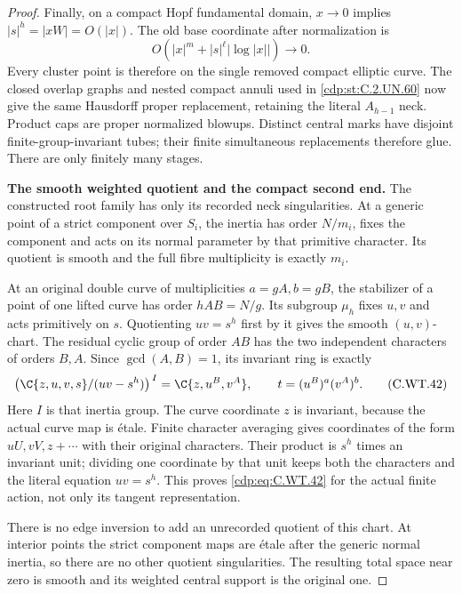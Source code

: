 \begin{proof}
Finally, on a compact Hopf
fundamental domain, \(x\to0\)
implies \(|s|^h=|xW|=O(|x|)\).
The old base coordinate after
normalization is
\[
          O(|x|^m+|s|^\ell|\log|x||)\longrightarrow0.
 \tag{C.WT.41}\label{cdp:eq:C.WT.41}
\]
Every cluster point is therefore
on the single removed compact
elliptic curve. The closed
overlap graphs and nested
compact annuli used in \ref{cdp:st:C.2.UN.60}
now give the same Hausdorff
proper replacement, retaining
the literal \(A_{h-1}\) neck.
Product caps are proper
normalized blowups. Distinct
central marks have disjoint
finite-group-invariant tubes;
their finite simultaneous
replacements therefore glue.
There are only finitely many
stages.

\par\medskip\noindent\textbf{The smooth weighted quotient and the compact second end.}
The constructed root family
has only its recorded neck
singularities. At a generic
point of a strict component
over \(S_i\), the inertia has
order \(N/m_i\), fixes the
component and acts on its
normal parameter by that
primitive character. Its
quotient is smooth and the
full fibre multiplicity is
exactly \(m_i\).

At an original double curve
of multiplicities \(a=gA,b=gB\),
the stabilizer of a point of
one lifted curve has order
\(hAB=N/g\). Its subgroup
\(\mu_h\) fixes \(u,v\) and
acts primitively on \(s\).
Quotienting \(uv=s^h\) first
by it gives the smooth
\((u,v)\)-chart. The residual
cyclic group of order \(AB\)
has the two independent
characters of orders \(B,A\).
Since \(\gcd(A,B)=1\), its
invariant ring is exactly
\[
 \bigl(\C\{z,u,v,s\}/(uv-s^h)\bigr)^{\,I}
       =\C\{z,u^B,v^A\},\qquad
                  t=(u^B)^a(v^A)^b .
 \tag{C.WT.42}\label{cdp:eq:C.WT.42}
\]
Here \(I\) is that inertia
group. The curve coordinate
\(z\) is invariant, because
the actual curve map is
\'{e}tale. Finite character
averaging gives coordinates
of the form \(uU,vV,z+\cdots\)
with their original characters.
Their product is \(s^h\)
times an invariant unit;
dividing one coordinate by
that unit keeps both the
characters and the literal
equation \(uv=s^h\).
This proves \eqref{cdp:eq:C.WT.42} for the
actual finite action, not
only its tangent representation.

There is no edge inversion
to add an unrecorded quotient
of this chart. At interior
points the strict component
maps are \'{e}tale after the
generic normal inertia, so
there are no other quotient
singularities. The resulting
total space near zero is
smooth and its weighted
central support is the
original one.


\end{proof}
